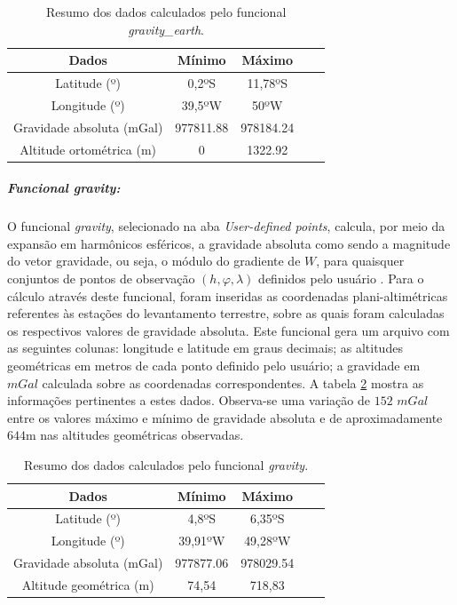 \begin{table}[h]
	\centering
	\caption{Resumo dos dados calculados pelo funcional \textit{gravity\_earth}.} 
	\label{tab:dados_sat}
	\begin{tabular}{c|c|c|c|c}
		
		Dados & Mínimo & Máximo  \\ %
		\hline                               %
		Latitude (º) & 0,2ºS & 11,78ºS \\
		Longitude (º) & 39,5ºW & 50ºW \\
		Gravidade absoluta (mGal) & 977811.88 & 978184.24 \\
		Altitude ortométrica (m) & 0 & 1322.92
	\end{tabular}
\end{table}
\subparagraph{Funcional \textit{gravity}:} O funcional \textit{gravity}, selecionado na aba \textit{User-defined points}, calcula, por meio da expansão em harmônicos esféricos, a gravidade absoluta como sendo a magnitude do vetor gravidade, ou seja, o módulo do gradiente de $W$, para quaisquer conjuntos de pontos de observação $(h, \varphi,\lambda)$ definidos pelo usuário \cite{barthelmes2009}. Para o cálculo através deste funcional, foram inseridas as coordenadas plani-altimétricas referentes às estações do levantamento terrestre, sobre as quais foram calculadas os respectivos valores de gravidade absoluta. Este funcional gera um arquivo com as seguintes colunas: longitude e latitude em graus decimais; as altitudes geométricas em metros de cada ponto definido pelo usuário; a gravidade em $mGal$ calculada sobre as coordenadas correspondentes. A tabela \ref{tab:dados_sat_pred} mostra as informações pertinentes a estes dados. Observa-se uma variação de $152$ $mGal$ entre os valores máximo e mínimo de gravidade absoluta e de aproximadamente $644$m nas altitudes geométricas observadas. 

\begin{table}[H]
	\centering
	\caption{Resumo dos dados calculados pelo funcional \textit{gravity}.}
	\label{tab:dados_sat_pred}
	\begin{tabular}{c|c|c|c|c}
		
		Dados & Mínimo & Máximo  \\ %
		\hline                               %
		Latitude (º) & 4,8ºS & 6,35ºS \\
		Longitude (º) & 39,91ºW & 49,28ºW \\
		Gravidade absoluta (mGal) & 977877.06 & 978029.54 \\
		Altitude geométrica (m) & 74,54 & 718,83 
	\end{tabular}
\end{table}

